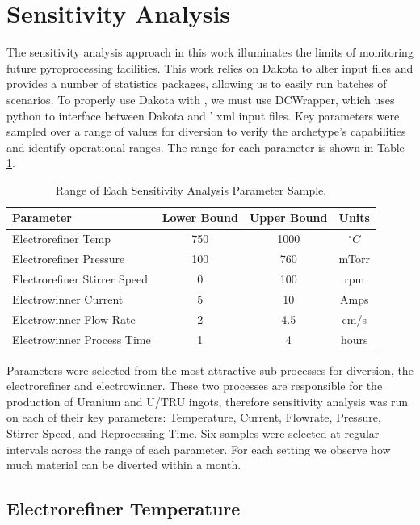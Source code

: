 \section{Sensitivity Analysis}

The sensitivity analysis approach in this work illuminates the limits of monitoring future pyroprocessing facilities. This work relies on Dakota to alter \Cyclus input files and provides a number of statistics packages, allowing us to easily
run batches of scenarios. To properly use Dakota with \Cyclus, we must use DCWrapper, which uses python to interface between Dakota and \Cyclus' xml input files. 
Key parameters were sampled over a range of values for diversion to verify the archetype's capabilities and identify operational ranges. The range for each parameter is shown in Table \ref{tab:range}. 

\begin{table}[h]
	\centering
	\begin{tabularx}{0.85\linewidth}{lccc}
		\hline
		\textbf{Parameter} & \textbf{Lower Bound} & \textbf{Upper Bound} & \textbf{Units} \\
		\hline \hline
		Electrorefiner Temp & 750 & 1000 & $^\circ C$ \\ \hline
		Electrorefiner Pressure & 100 & 760 & mTorr \\ \hline
		Electrorefiner Stirrer Speed & 0 & 100 & rpm \\ \hline
		Electrowinner Current & 5 & 10 & Amps \\ \hline
		Electrowinner Flow Rate & 2 & 4.5 & cm/s \\ \hline
		Electrowinner Process Time & 1 & 4 & hours \\ \hline
	\end{tabularx}
	\caption {Range of Each Sensitivity Analysis Parameter Sample.}
	\label {tab:range}
\end{table}

Parameters were selected from the most attractive
sub-processes for diversion, the electrorefiner and electrowinner. These two processes are responsible for the production of Uranium and U/TRU ingots, therefore sensitivity analysis was run
on each of their key parameters: Temperature, Current, Flowrate, Pressure, Stirrer Speed, and Reprocessing Time. Six samples were selected at regular intervals across the range of each parameter. For each setting we observe how much material can be diverted within a month.

\subsection{Electrorefiner Temperature}

